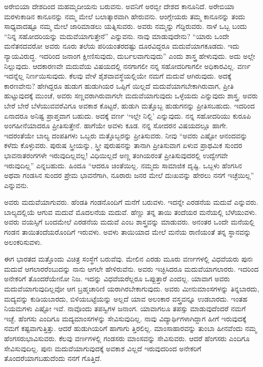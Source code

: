 ಅರೇಬಿಯಾ ದೇಶದಿಂದ ಮಹಮ್ಮದೀಯನು ಬರುವನು. ಅವನಿಗೆ ಅರಬ್ಬೀ ದೇಶದ ಕಾನೂನಿದೆ. ಅರೇಬಿಯಾ ಮರಳುಕಾಡಿನ ಕಾನೂನನ್ನು ನಮ್ಮ ಮೇಲೆ ಬಲಾತ್ಕಾರವಾಗಿ ಹೇರುವನು. ಆಂಗ್ಲೇಯರು ತಮ್ಮ ಕಾನೂನನ್ನು ತಂದು ಸಾಧ್ಯವಾದಷ್ಟೂ ನಮ್ಮ ಮೇಲೆ ಜಾರಿಮಾಡಲು ಯತ್ನಿಸುವರು. ಅವರು ನಮ್ಮನ್ನು ಗೆದ್ದಿರುವರು. ನಾಳೆ ಒಬ್ಬ ಬಂದು “ನಿನ್ನ ಸಹೋದರಿಯನ್ನು ಮದುವೆಯಾಗುತ್ತೇನೆ” ಎನ್ನುವನು. ನಾವು ಮಾಡುವುದೇನು? “ಯಾರು ಒಂದೇ ಮನೆತನದವರೋ ಅವರು ನೂರು ತಲೆಯ ಪರಿಯಂತರದಷ್ಟು ದೂರವಿದ್ದರೂ ಮದುವೆಯಾಗಕೂಡದು. ಇದು ನ್ಯಾಯವಿರುದ್ಧ. ಇದರಿಂದ ಜನಾಂಗ ಕ್ಷೀಣಿಸುವುದು, ದುರ್ಬಲವಾಗುವುದು” ಎಂದು ಶಾಸ್ತ್ರ ಹೇಳುವುದು. ಅದು ಅಲ್ಲೇ ನಿಲ್ಲುವುದು. ಆದಕಾರಣವೇ ಮದುವೆಯ ವಿಷಯದಲ್ಲಿ ನನಗಾಗಲೀ ನನ್ನ ಸಹೋದರಿಗಾಗಲೀ ಅಧಿಕಾರವಿಲ್ಲ. ವರ್ಣ ಇದನ್ನೆಲ್ಲ ನಿರ್ಣಯಿಸುವುದು. ಕೆಲವು ವೇಳೆ ಶೈಶವಾವಸ್ಥೆಯಲ್ಲಿಯೇ ನಮಗೆ ಮದುವೆ ಆಗಿರುವುದು. ಅದಕ್ಕೆ ಕಾರಣವೇನು? ಹೇಗಿದ್ದರೂ ಹುಡುಗ ಹುಡುಗಿಯರ ಒಪ್ಪಿಗೆ ಯಿಲ್ಲದೆ ಮದುವೆಯಾಗಬೇಕಾಗಿರುವಾಗ, ಪ್ರೀತಿ ಹುಟ್ಟುವುದಕ್ಕೆ ಮುಂಚೆ, ಅವರು ಸಣ್ಣವರಾಗಿರುವಾಗಲೇ ಮದುವೆಯಾಗುವುದು ಒಳ್ಳೆಯದು ಎನ್ನುವುದು ಶಾಸ್ತ್ರ. ಅವರು ಬೇರೆ ಬೇರೆ ಬೆಳೆಯುವವರೆವಿಗೂ ಅವಕಾಶ ಕೊಟ್ಟರೆ, ಹುಡುಗಿ ಮತ್ತೊಬ್ಬ ಹುಡುಗನನ್ನು ಪ್ರೀತಿಸಬಹುದು. ಇದರಿಂದ ಏನಾದರೂ ಅನಿಷ್ಟ ಪ್ರಾಪ್ತವಾಗ ಬಹುದು. ಅದಕ್ಕೆ ವರ್ಣ ‘ಇಲ್ಲೇ ನಿಲ್ಲಿ’ ಎನ್ನುವುದು. ನನ್ನ ಸಹೋದರಿಯು ಕುರೂಪಿ ಅಂಗಹೀನೆಯಾದರೂ ಪ್ರೀತಿಸುತ್ತೇನೆ. ಹಾಗೆಯೇ ಅವಳು ಕೂಡ. ನನ್ನ ಸೋದರನ ವಿಷಯದಲ್ಲೂ ಹಾಗೇ. ಇದರಂತೆಯೇ ಬಾಲ್ಯ ದಂಪತಿಗಳು ಒಬ್ಬರು ಮತ್ತೊಬ್ಬರನ್ನು ಪ್ರೀತಿಸುವರು. ನೀವು “ಅವರು ಎಷ್ಟೋ ಆನಂದವನ್ನು ಕಳೆದು ಕೊಳ್ಳುವರು. ಪುರುಷ ಸ್ತ್ರೀಯನ್ನು, ಸ್ತ್ರೀ ಪುರುಷನನ್ನು ತಾನಾಗಿ ಪ್ರೀತಿಸುವಾಗ ಏಳುವ ಪ್ರಾಥಮಿಕ ಸುಂದರ ಭಾವನಾತರಂಗಗಳೇ ಇರುವುದಿಲ್ಲವಲ್ಲ! ವಿಧಿಯಿಲ್ಲದೆ ಅಣ್ಣ ತಂಗಿಯರಂತೆ ಪ್ರೀತಿಸುವುದರಲ್ಲಿ ಉದ್ವೇಗವೇ ಇರುವುದಿಲ್ಲ” ಎನ್ನಬಹುದು. ಹಿಂದೂ “ಆದರೂ ಚಿಂತೆಯಿಲ್ಲ. ನಮ್ಮದು ಸಾಮಾಜಿಕ ದೃಷ್ಟಿ. ಒಬ್ಬಳು ಹೆಂಗಸಿನ ಅಥವಾ ಗಂಡಸಿನ ಸುಂದರ ಪ್ರೇಮ ಭಾವನೆಗಾಗಿ, ನೂರಾರು ಜನರ ಮೇಲೆ ದುಃಖವನ್ನು ಹೇರಲು ನನಗೆ ಇಚ್ಛೆಯಿಲ್ಲ” ಎನ್ನುವನು.

ಅವರು ಮದುವೆಯಾಗುವರು. ಹೆಂಡತಿ ಗಂಡನೊಂದಿಗೆ ಮನೆಗೆ ಬರುವಳು. ಇದನ್ನೇ ಎರಡನೆಯ ಮದುವೆ ಎನ್ನುವರು. ಬಾಲ್ಯದಲ್ಲಿಯೆ ಆಗುವ ಮದುವೆ ಮೊದಲನೆಯ ಮದುವೆ. ಹೆಣ್ಣು ತನ್ನ ತಾಯಿ ತಂದೆಯರ ಮನೆಯಲ್ಲಿ ಬೆಳೆಯುವಳು. ಅವರು ವಯಸ್ಸಿಗೆ ಬಂದಮೇಲೆ ಎರಡನೆಯ ಮದುವೆ ಎಂಬ ಶಾಸ್ತ್ರವನ್ನು ಮಾಡುವರು. ಅನಂತರ ಒಂದೇ ಮನೆಯಲ್ಲಿ ಗಂಡನ ತಾಯಿತಂದೆಯರೊಂದಿಗೆ ಇರುವಳು. ಅವಳು ತಾಯಿಯಾದ ಮೇಲೆ ಮನೆಯ ರಾಣಿಯಂತೆ ತನ್ನ ಸ್ಥಾನವನ್ನು ಅಲಂಕರಿಸುವಳು.

ಈಗ ಭಾರತದ ಮತ್ತೊಂದು ವಿಚಿತ್ರ ಸಂಸ್ಥೆಗೆ ಬರುವೆವು. ಮೇಲಿನ ಎರಡು ಮೂರು ವರ್ಣಗಳಲ್ಲಿ ವಿಧವೆಯರು ಪುನಃ ಮದುವೆ ಆಗಲಾರರೆಂಬುದನ್ನು ನಾನು ಆಗಲೇ ಹೇಳಿರುವೆನು. ಅವರು ಇಚ್ಛಿಸಿದರೂ ಮದುವೆಯಾಗಲಾರರು. ಇದರಿಂದ ಅನೇಕರಿಗೆ ತೊಂದರೆಯೇನೋ ನಿಜ. ಇದನ್ನು ವಿಧವೆಯರೆಲ್ಲರೂ ಒಪ್ಪುತ್ತಾರೆ ಎಂದಲ್ಲ. ಯಾವಾಗ ಅವರು ಮದುವೆಯಾಗುವುದಿಲ್ಲವೋ ಆಗ ಬ್ರಹ್ಮಚಾರಿಣಿ ಯರಾಗಿರಬೇಕಾಗುವುದು. ಅವರು ಮೀನುಮಾಂಸಗಳನ್ನು ತಿನ್ನಬಾರದು, ಮದ್ಯವನ್ನು ಕುಡಿಯಬಾರದು, ಬಿಳಿಯಬಟ್ಟೆಯನ್ನು ಅಲ್ಲದೆ ಯಾವ ಅಲಂಕಾರ ವಸ್ತ್ರವನ್ನೂ ಉಡಬಾರದು. ಇಂತಹ ನಿಯಮಗಳು ಎಷ್ಟೋ ಇವೆ. ನಾವೊಂದು ತಪಸ್ವಿಗಳ ಜನಾಂಗ. ಯಾವಾಗಲೂ ತಪಸ್ಸು ಮಾಡುವುದೆಂದರೆ ನಮಗೆ ಇಚ್ಛೆ. ಹೆಂಗಸು ಎಂದಿಗೂ ಮದ್ಯಮಾಂಸಗಳನ್ನು ಸೇವಿಸುವುದಿಲ್ಲ. ನಾವು ವಿದ್ಯಾರ್ಥಿಗಳಾಗಿದ್ದಾಗ ಹೀಗೆ ಇರುವುದಕ್ಕೆ ನಮಗೆ ಕಷ್ಟವಾಗುತ್ತಿತ್ತು. ಆದರೆ ಹುಡುಗಿಯರಿಗೆ ಹಾಗಾಗು ತ್ತಿರಲಿಲ್ಲ. ಮಾಂಸಾಹಾರವನ್ನು ತುಂಬಾ ಹೀನವೆಂದು ನಮ್ಮ ಹೆಂಗಸರುಭಾವಿಸುವರು. ಕೆಲವು ವರ್ಣಗಳಲ್ಲಿ ಗಂಡಸರು ಮಾಂಸವನ್ನು ಸೇವಿಸುವರು. ಆದರೆ ಹೆಂಗಸರು ಎಂದಿಗೂ ಸೇವಿಸುವುದಿಲ್ಲ. ಪುನಃ ಮದುವೆಯಾಗುವುದಕ್ಕೆ ಅವಕಾಶ ವಿಲ್ಲದೆ ಇರುವುದರಿಂದ ಅನೇಕರಿಗೆ ತೊಂದರೆಯಾಗಬಹುದೆಂದು ನನಗೆ ಗೊತ್ತಿದೆ.

